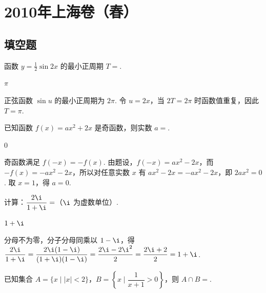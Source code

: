 \chapter{2010年上海卷（春）}

\section{填空题}

\begin{problem}
函数 \(y=\frac{1}{2}\sin2x\) 的最小正周期 \(T=\)\fillinblank{}.
\end{problem}

\begin{answer}
\(\pi\)
\end{answer}

\begin{solution}
正弦函数 \(\sin u\) 的最小正周期为 \(2\pi\). 令 \(u=2x\)，当 \(2T=2\pi\) 时函数值重复，因此 \(T=\pi\).
\end{solution}

\begin{problem}
已知函数 \(f(x)=ax^2+2x\) 是奇函数，则实数 \(a=\)\fillinblank{}.
\end{problem}

\begin{answer}
\(0\)
\end{answer}

\begin{solution}
奇函数满足 \(f(-x)=-f(x)\). 由题设，\(f(-x)=ax^2-2x\)，而 \(-f(x)=-ax^2-2x\)，所以对任意实数 \(x\) 有 \(ax^2-2x=-ax^2-2x\)，即 \(2ax^2=0\). 取 \(x=1\)，得 \(a=0\).
\end{solution}

\begin{problem}
计算：\(\dfrac{2\i}{1+\i}=\)\fillinblank{}（\(\i\) 为虚数单位）.
\end{problem}

\begin{answer}
\(1+\i\)
\end{answer}

\begin{solution}
分母不为零，分子分母同乘以 \(1-\i\)，得 \(\dfrac{2\i}{1+\i}=\dfrac{2\i(1-\i)}{(1+\i)(1-\i)}=\dfrac{2\i-2\i^2}{2}=\dfrac{2\i+2}{2}=1+\i\).
\end{solution}

\begin{problem}
已知集合 \(A=\{x\mid |x|<2\}\)，\(B=\left\{x\mid \dfrac{1}{x+1}>0\right\}\)，则 \(A\cap B=\)\fillinblank{}.
\end{problem}


